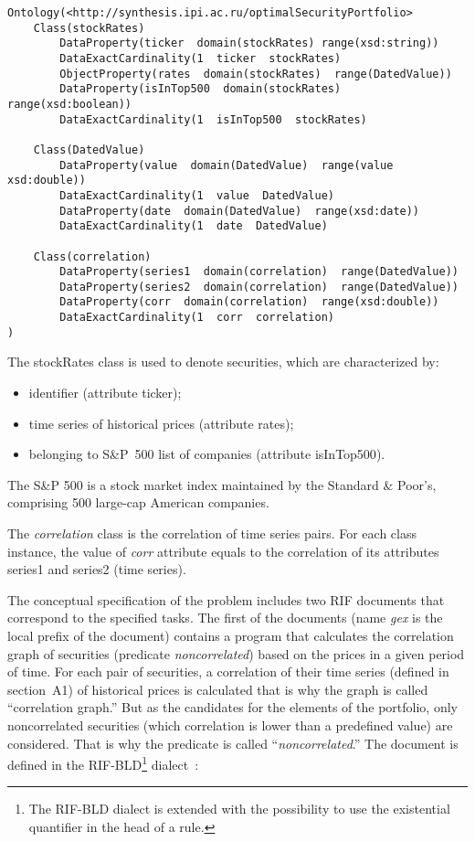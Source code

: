 {\small

\noindent
\begin{verbatim}
Ontology(<http://synthesis.ipi.ac.ru/optimalSecurityPortfolio>
    Class(stockRates)
        DataProperty(ticker  domain(stockRates) range(xsd:string))
        DataExactCardinality(1  ticker  stockRates)
        ObjectProperty(rates  domain(stockRates)  range(DatedValue))
        DataProperty(isInTop500  domain(stockRates)  range(xsd:boolean))
        DataExactCardinality(1  isInTop500  stockRates)

    Class(DatedValue)
        DataProperty(value  domain(DatedValue)  range(value  xsd:double))
        DataExactCardinality(1  value  DatedValue)
        DataProperty(date  domain(DatedValue)  range(xsd:date))
        DataExactCardinality(1  date  DatedValue)

    Class(correlation)
        DataProperty(series1  domain(correlation)  range(DatedValue))
        DataProperty(series2  domain(correlation)  range(DatedValue))
        DataProperty(corr  domain(correlation)  range(xsd:double))
        DataExactCardinality(1  corr  correlation)
)
\end{verbatim}




 The {\sf stockRates} class is used to denote securities, which are characterized by:
  \begin{itemize}
  \item identifier (attribute {\sf ticker});
\item time series of historical prices (attribute {\sf rates});
\item belonging to S\&P~500 list of companies (attribute {\sf isInTop500}).
\end{itemize}

  The S\&P 500 is a stock market index maintained by the Standard \& Poor's,
comprising 500 large-cap American companies.

  The \textit{correlation} class is the correlation of time series pairs. For each class
instance, the value of \textit{corr} attribute equals to the correlation of its attributes
{\sf series1} and {\sf series2} (time series).

  The conceptual specification of the problem includes two RIF documents that
correspond to the specified tasks. The first of the documents (name \textit{gex} is the
local prefix of the document) contains a program that calculates the correlation graph
of securities (predicate \textit{noncorrelated}) based on the prices in a given period of
time. For each pair of securities, a correlation of their time series (defined in
section~A1) of historical prices is calculated that is why the graph is called
``correlation graph.'' But as the candidates for the elements of the portfolio, only
  noncorrelated securities (which correlation is lower than a predefined value) are
considered. That is why the predicate is called ``\textit{noncorrelated}.'' The document
is defined in the RIF-BLD\footnote{The RIF-BLD dialect is extended with the
possibility to use the existential quantifier in the head of a rule.}
  dialect~\cite{20-kal}:

}
